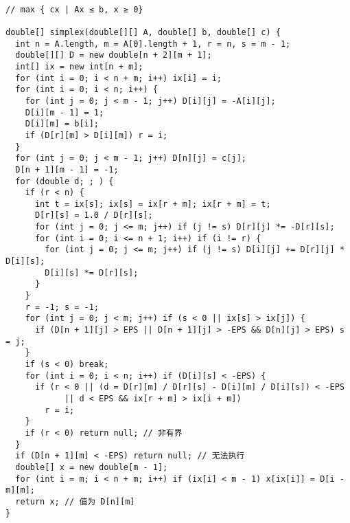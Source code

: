 \begin{lstlisting}

// max { cx | Ax ≤ b, x ≥ 0}

double[] simplex(double[][] A, double[] b, double[] c) {
  int n = A.length, m = A[0].length + 1, r = n, s = m - 1;
  double[][] D = new double[n + 2][m + 1];
  int[] ix = new int[n + m];
  for (int i = 0; i < n + m; i++) ix[i] = i;
  for (int i = 0; i < n; i++) {
    for (int j = 0; j < m - 1; j++) D[i][j] = -A[i][j];
    D[i][m - 1] = 1;
    D[i][m] = b[i];
    if (D[r][m] > D[i][m]) r = i;
  }
  for (int j = 0; j < m - 1; j++) D[n][j] = c[j];
  D[n + 1][m - 1] = -1;
  for (double d; ; ) {
    if (r < n) {
      int t = ix[s]; ix[s] = ix[r + m]; ix[r + m] = t;
      D[r][s] = 1.0 / D[r][s];
      for (int j = 0; j <= m; j++) if (j != s) D[r][j] *= -D[r][s];
      for (int i = 0; i <= n + 1; i++) if (i != r) {
        for (int j = 0; j <= m; j++) if (j != s) D[i][j] += D[r][j] * D[i][s];
        D[i][s] *= D[r][s];
      }
    }
    r = -1; s = -1;
    for (int j = 0; j < m; j++) if (s < 0 || ix[s] > ix[j]) {
      if (D[n + 1][j] > EPS || D[n + 1][j] > -EPS && D[n][j] > EPS) s = j;
    }
    if (s < 0) break;
    for (int i = 0; i < n; i++) if (D[i][s] < -EPS) {
      if (r < 0 || (d = D[r][m] / D[r][s] - D[i][m] / D[i][s]) < -EPS
            || d < EPS && ix[r + m] > ix[i + m])
        r = i;
    }
    if (r < 0) return null; // 非有界
  }
  if (D[n + 1][m] < -EPS) return null; // 无法执行
  double[] x = new double[m - 1];
  for (int i = m; i < n + m; i++) if (ix[i] < m - 1) x[ix[i]] = D[i - m][m];
  return x; // 值为 D[n][m]
}


\end{lstlisting}